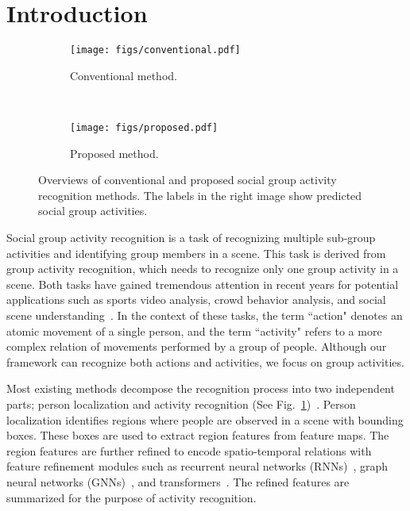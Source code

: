 \documentclass[runningheads]{llncs}
\begin{document}
\section{Introduction}

\begin{figure}	
 \centering
 \begin{subfigure}[t]{1.\linewidth}
  \centering
  \texttt{[image: figs/conventional.pdf]}
  \caption{Conventional method.}\label{fig:conventional}
 \end{subfigure} \\
 \begin{subfigure}[t]{1.\linewidth}
  \centering
  \texttt{[image: figs/proposed.pdf]}
  \caption{Proposed method.}\label{fig:proposed}
 \end{subfigure}
 \caption{Overviews of conventional and proposed social group activity recognition methods. The labels in the right image show predicted social group activities.}\label{fig:comp_overview}
 \vspace{-1.0ex}
\end{figure}

Social group activity recognition is a task of recognizing multiple sub-group activities and identifying group members in a scene. This task is derived from group activity recognition, which needs to recognize only one group activity in a scene. Both tasks have gained tremendous attention in recent years for potential applications such as sports video analysis, crowd behavior analysis, and social scene understanding~\cite{lan_nips2010,lan_cvpr2012,lan_tpami2012,amer_iccv2013,amer_eccv2014,amer_tpami2016,deng_cvpr2016,ibrahim_cvpr2016,bagautdinov_cvpr2017,shu_cvpr2017,wang_cvpr2017,li_iccv2017,kong_icassp2018,qi_eccv2018,ibrahim_eccv2018,wu_cvpr2019,azar_cvpr2019,gavrilyuk_cvpr2020,hu_cvpr2020,ehsanpour_eccv2020,pramono_eccv2020,li_iccv2021,yuan_iccv2021,Zhou2021COMPOSERCL}.
In the context of these tasks, the term ``action" denotes an atomic movement of a single person, and the term ``activity" refers to a more complex relation of movements performed by a group of people. Although our framework can recognize both actions and activities, we focus on group activities.

Most existing methods decompose the recognition process into two independent parts; person localization and activity recognition (See Fig.~\ref{fig:conventional})~\cite{deng_cvpr2016,ibrahim_cvpr2016,bagautdinov_cvpr2017,shu_cvpr2017,wang_cvpr2017,kong_icassp2018,qi_eccv2018,wu_cvpr2019,ehsanpour_eccv2020,gavrilyuk_cvpr2020,hu_cvpr2020,pramono_eccv2020,li_iccv2021,yuan_iccv2021,Zhou2021COMPOSERCL}.
Person localization identifies regions where people are observed in a scene with bounding boxes. These boxes are used to extract region features from feature maps. The region features are further refined to encode spatio-temporal relations with feature refinement modules such as recurrent neural networks (RNNs)~\cite{sepp_nc1998,cho_emnlp2014}, graph neural networks (GNNs)~\cite{kipf_iclr2017,velickovic_iclr2018}, and transformers~\cite{vaswani_nips2017}. The refined features are summarized for the purpose of activity recognition.
\end{document}
